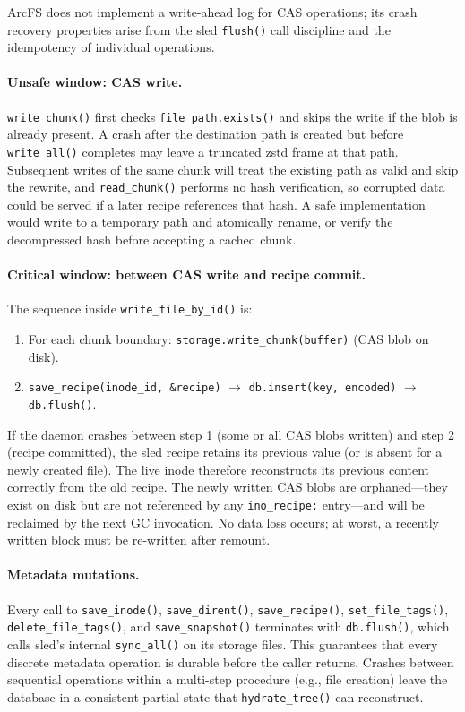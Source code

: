 \documentclass[5p,times]{elsarticle}
\begin{document}
ArcFS does not implement a write-ahead log for CAS operations; its crash
recovery properties arise from the sled \texttt{flush()} call discipline
and the idempotency of individual operations.

\paragraph{Unsafe window: CAS write.}
\texttt{write\_chunk()} first checks \texttt{file\_path.exists()} and
skips the write if the blob is already present.  A crash after the
destination path is created but before \texttt{write\_all()} completes
may leave a truncated zstd frame at that path.  Subsequent writes of the
same chunk will treat the existing path as valid and skip the rewrite,
and \texttt{read\_chunk()} performs no hash verification, so corrupted
data could be served if a later recipe references that hash.  A safe
implementation would write to a temporary path and atomically rename, or
verify the decompressed hash before accepting a cached chunk.

\paragraph{Critical window: between CAS write and recipe commit.}
The sequence inside \texttt{write\_file\_by\_id()} is:
\begin{enumerate}
\item For each chunk boundary: \texttt{storage.write\_chunk(buffer)}
  (CAS blob on disk).
\item \texttt{save\_recipe(inode\_id, \&recipe)} $\to$
  \texttt{db.insert(key, encoded)} $\to$ \texttt{db.flush()}.
\end{enumerate}
If the daemon crashes between step 1 (some or all CAS blobs written)
and step 2 (recipe committed), the sled recipe retains its previous
value (or is absent for a newly created file).  The live inode
therefore reconstructs its previous content correctly from the old
recipe.  The newly written CAS blobs are orphaned---they exist on disk but
are not referenced by any \texttt{ino\_recipe:} entry---and will be
reclaimed by the next GC invocation.  No data loss occurs; at worst,
a recently written block must be re-written after remount.

\paragraph{Metadata mutations.}
Every call to \texttt{save\_inode()}, \texttt{save\_dirent()},
\texttt{save\_recipe()}, \texttt{set\_file\_tags()},
\texttt{delete\_file\_tags()}, and \texttt{save\_snapshot()} terminates
with \texttt{db.flush()}, which calls sled's internal \texttt{sync\_all()}
on its storage files.  This guarantees that every discrete metadata
operation is durable before the caller returns.  Crashes between
sequential operations within a multi-step procedure (e.g., file
creation) leave the database in a consistent partial state that
\texttt{hydrate\_tree()} can reconstruct.
\end{document}
